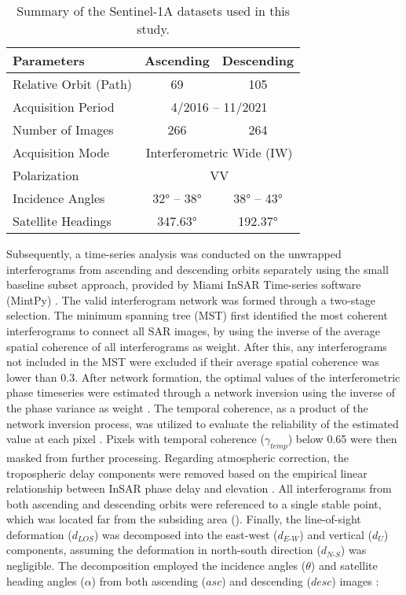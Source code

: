 \begin{table}[H]
	\centering
	\caption{Summary of the Sentinel-1A datasets used in this study.}
	\label{tab:sentinel1_info}
	
	\begin{tabular}{lcc}
		\toprule
		\textbf{Parameters} & \textbf{Ascending} & \textbf{Descending} \\
		\midrule
		Relative Orbit (Path) & 69 & 105 \\
		\multicolumn{1}{l}{Acquisition Period} & \multicolumn{2}{c}{4/2016 – 11/2021} \\
		Number of Images      & 266 & 264 \\
		\multicolumn{1}{l}{Acquisition Mode} & \multicolumn{2}{c}{Interferometric Wide (IW)} \\
		\multicolumn{1}{l}{Polarization} & \multicolumn{2}{c}{VV} \\
		Incidence Angles & 32° – 38° & 38° – 43° \\
		Satellite Headings & 347.63° & 192.37° \\
		\bottomrule
	\end{tabular}
\end{table}

Subsequently, a time-series analysis was conducted on the unwrapped interferograms from ascending and descending orbits separately using the small baseline subset approach, provided by Miami InSAR Time-series software (MintPy) \citep{mintpy_yunjun}. The valid interferogram network was formed through a two-stage selection. The minimum spanning tree (MST) \citep{mst_perissin} first identified the most coherent interferograms to connect all SAR images, by using the inverse of the average spatial coherence of all interferograms as weight. After this, any interferograms not included in the MST were excluded if their average spatial coherence was lower than $\text{0.3}$. After network formation, the optimal values of the interferometric phase timeseries were estimated through a network inversion using the inverse of the phase variance as weight \citep{networkinverse_var}. The temporal coherence, as a product of the network inversion process, was utilized to evaluate the reliability of the estimated value at each pixel \citep{temporal_coherence}. Pixels with temporal coherence ($\gamma_\textit{temp}$) below 0.65 were then masked from further processing. Regarding atmospheric correction, the tropospheric delay components were removed based on the empirical linear relationship between InSAR phase delay and elevation \citep{height_correlation}. All interferograms from both ascending and descending orbits were referenced to a single stable point, which was located far from the subsiding area (). Finally, the line-of-sight deformation (${d_\textit{LOS}}$) was decomposed into the east-west (${d_\textit{E-W}}$) and vertical (${d_\textit{U}}$) components, assuming the deformation in north-south direction (${d_\textit{N-S}}$) was negligible. The decomposition employed the incidence angles ($\theta$) and satellite heading angles ($\alpha$) from both ascending ($\textit{asc}$) and descending ($\textit{desc}$) images \citep{hanssen_book}:

